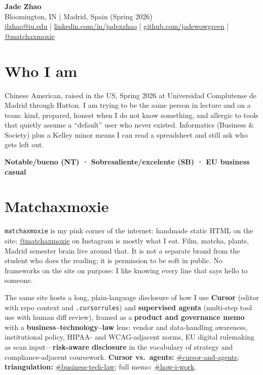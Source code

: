 \documentclass[11pt]{article}
\begin{document}
\begin{center}
    {\LARGE \textbf{Jade Zhao}}\\
    \vspace{0.25em}
    {\small Bloomington, IN \;|\; Madrid, Spain (Spring 2026)}\\
    \vspace{0.25em}
    {\small
      \href{mailto:jlzhao@iu.edu}{jlzhao@iu.edu}
      \;|\;
      \href{https://linkedin.com/in/jadexzhao}{linkedin.com/in/jadexzhao}
      \;|\;
      \href{https://github.com/jadewowgreen}{github.com/jadewowgreen}
      \;|\;
      \href{https://www.instagram.com/matchaxmoxie/}{@matchaxmoxie}
    }
    \vspace{0.25em}
\end{center}

\vspace{0.75em}

\section*{Who I am}
Chinese American, raised in the US, Spring 2026 at Universidad Complutense de Madrid through Hutton. I am trying to be the same person in lecture and on a team: kind, prepared, honest when I do not know something, and allergic to tools that quietly assume a ``default'' user who never existed. Informatics (Business \& Society) plus a Kelley minor means I can read a spreadsheet and still ask who gets left out.

{\bfseries Notable/bueno (NT) · Sobresaliente/excelente (SB) · EU business casual}

\section*{Matchaxmoxie}
\texttt{matchaxmoxie} is my pink corner of the internet: handmade static HTML on the site; \href{https://www.instagram.com/matchaxmoxie/}{@matchaxmoxie} on Instagram is mostly what I eat. Film, matcha, plants, Madrid semester brain live around that. It is not a separate brand from the student who does the reading; it is permission to be soft in public. No frameworks on the site on purpose: I like knowing every line that says hello to someone.

\noindent The same site hosts a long, plain-language disclosure of how I use \textbf{Cursor} (editor with repo context and \texttt{.cursorrules}) and \textbf{supervised agents} (multi-step tool use with human diff review), framed as a \textbf{product and governance memo} with a \textbf{business--technology--law} lens: vendor and data-handling awareness, institutional policy, HIPAA- and WCAG-adjacent norms, EU digital rulemaking as scan input---\textbf{risk-aware disclosure} in the vocabulary of strategy and compliance-adjacent coursework. \textbf{Cursor vs.\ agents:} \href{https://matchaxmoxie.github.io/matchaxmoxie/\#cursor-and-agents}{\#cursor-and-agents}; \textbf{triangulation:} \href{https://matchaxmoxie.github.io/matchaxmoxie/\#business-tech-law}{\#business-tech-law}; full memo: \href{https://matchaxmoxie.github.io/matchaxmoxie/\#how-i-work}{\#how-i-work}.
\end{document}
